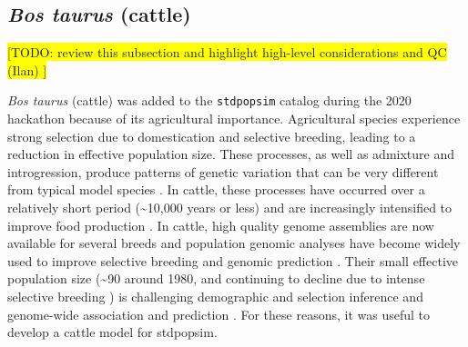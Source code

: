 \documentclass[hidelinks]{article}
\begin{document}
\hypertarget{bos-taurus}{%
	\subsection*{\texorpdfstring{\emph{Bos
				taurus} (cattle)}{Bos taurus (cattle)}}\label{bos-taurus}}

\colorbox{yellow}{[TODO: review this subsection and highlight high-level considerations and QC (Ilan) ]}


\emph{Bos taurus} (cattle) was added to the \texttt{stdpopsim} catalog during the 2020 hackathon because of its agricultural importance. Agricultural species experience
strong selection due to domestication and selective breeding, leading
to a reduction in effective population size. These processes,
as well as admixture and introgression, produce patterns
of genetic variation that can be very different from typical model
species \citep{Larson2013}. In cattle, these processes have occurred over a
relatively short period (\textasciitilde 10,000 years or less) and are
increasingly intensified to improve food production \citep{Gaut2018,
MacLeod2013}. In cattle, high quality genome assemblies are now
available for several breeds \citep[e.g.,][]{Rosen2020, Heaton2021,
Talenti2022} and population genomic analyses have become widely used to
improve selective breeding and genomic prediction \citep{Meuwissen2001,
MacLeod2014, Obsteter2021}. Their small effective population size
(\textasciitilde 90 around 1980, and continuing to decline due to intense
selective breeding \citep{MacLeod2013, VanRaden2020, Makanjouloa2020}) is
challenging demographic and selection inference \citep{MacLeod2013,
Hartfield2022} and genome-wide association and prediction
\citep{MacLeod2014}. For these reasons, it was useful to develop a
cattle model for stdpopsim.
\end{document}
